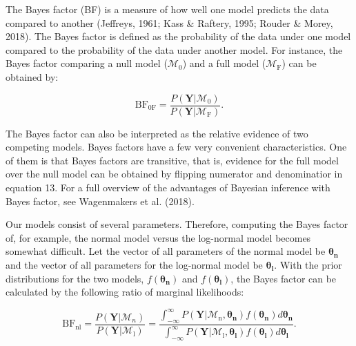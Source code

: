 \documentclass[
  english,
  doc,floatsintext]{apa6}
\begin{document}
The Bayes factor (BF) is a measure of how well one model predicts the data compared to another (Jeffreys, 1961; Kass \& Raftery, 1995; Rouder \& Morey, 2018). The Bayes factor is defined as the probability of the data under one model compared to the probability of the data under another model. For instance, the Bayes factor comparing a null model (\(\mathcal{M}_0\)) and a full model (\(\mathcal{M}_{\text{F}}\)) can be obtained by:

\begin{equation}
\text{BF}_{0\text{F}} = \frac{P(\bm{Y} | \mathcal{M}_0)}{P(\bm{Y} | \mathcal{M}_{\text{F}})}. 
\end{equation}

The Bayes factor can also be interpreted as the relative evidence of two competing models. Bayes factors have a few very convenient characteristics. One of them is that Bayes factors are transitive, that is, evidence for the full model over the null model can be obtained by flipping numerator and denominatior in equation 13. For a full overview of the advantages of Bayesian inference with Bayes factor, see Wagenmakers et al. (2018).

Our models consist of several parameters. Therefore, computing the Bayes factor of, for example, the normal model versus the log-normal model becomes somewhat difficult. Let the vector of all parameters of the normal model be \(\bm{\theta_\text{n}}\) and the vector of all parameters for the log-normal model be \(\bm{\theta_{\text{l}}}\). With the prior distributions for the two models, \(f(\bm{\theta_\text{n}})\) and \(f(\bm{\theta_\text{l}})\), the Bayes factor can be calculated by the following ratio of marginal likelihoods:

\begin{equation}
\text{BF}_{\text{nl}} = \frac{P(\bm{Y} | \mathcal{M}_n)}{P(\bm{Y} | \mathcal{M}_{\text{l}})} = \frac{\int_{-\infty}^{\infty}P(\bm{Y} | \mathcal{M}_\text{n}, \bm{\theta_{\text{n}}})f(\bm{\theta_{\text{n}}})d\bm{\theta_{\text{n}}}}{\int_{-\infty}^{\infty}P(\bm{Y} | \mathcal{M}_\text{l}, \bm{\theta_{\text{l}}})f(\bm{\theta_{\text{l}}})d\bm{\theta_{\text{l}}}}. 
\end{equation}
\end{document}
